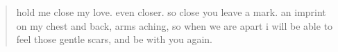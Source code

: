 
\begin{verse}
hold me close my love.
even closer.
so close you leave a mark.
an imprint on my chest 
and back, arms aching,
so when we are apart
i will be able to feel
those gentle scars,
and be with you again.
\end{verse}
